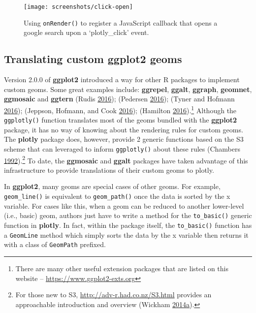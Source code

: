 \documentclass[12pt,]{isuthesis}
\let\rmarkdownfootnote\footnote%
\def\footnote{\protect\rmarkdownfootnote}
\begin{document}
\begin{figure}
\centering
\texttt{[image: screenshots/click-open]}
\caption{\label{fig:click-open}Using \texttt{onRender()} to register a
JavaScript callback that opens a google search upon a `plotly\_click'
event.}
\end{figure}

\hypertarget{translating-custom-ggplot2-geoms}{\subsection{Translating
custom ggplot2 geoms}\label{translating-custom-ggplot2-geoms}}

Version 2.0.0 of \textbf{ggplot2} introduced a way for other R packages
to implement custom geoms. Some great examples include:
\textbf{ggrepel}, \textbf{ggalt}, \textbf{ggraph}, \textbf{geomnet},
\textbf{ggmosaic} and \textbf{ggtern} (Rudis
\protect\hyperlink{ref-ggalt}{2016}); (Pedersen
\protect\hyperlink{ref-ggraph}{2016}); (Tyner and Hofmann
\protect\hyperlink{ref-geomnet}{2016}); (Jeppson, Hofmann, and Cook
\protect\hyperlink{ref-ggmosaic}{2016}); (Hamilton
\protect\hyperlink{ref-ggtern}{2016}).\footnote{There are many other
  useful extension packages that are listed on this website --
  \url{https://www.ggplot2-exts.org}} Although the \texttt{ggplotly()}
function translates most of the geoms bundled with the \textbf{ggplot2}
package, it has no way of knowing about the rendering rules for custom
geoms. The \textbf{plotly} package does, however, provide 2 generic
functions based on the S3 scheme that can leveraged to inform
\texttt{ggplotly()} about these rules (Chambers
\protect\hyperlink{ref-S3}{1992}).\footnote{For those new to S3,
  \url{http://adv-r.had.co.nz/S3.html} provides an approachable
  introduction and overview (Wickham
  \protect\hyperlink{ref-adv-r}{2014}\protect\hyperlink{ref-adv-r}{a}).}
To date, the \textbf{ggmosaic} and \textbf{ggalt} packages have taken
advantage of this infrastructure to provide translations of their custom
geoms to plotly.

In \textbf{ggplot2}, many geoms are special cases of other geoms. For
example, \texttt{geom\_line()} is equivalent to \texttt{geom\_path()}
once the data is sorted by the x variable. For cases like this, when a
geom can be reduced to another lower-level (i.e., basic) geom, authors
just have to write a method for the \texttt{to\_basic()} generic
function in \textbf{plotly}. In fact, within the package itself, the
\texttt{to\_basic()} function has a \texttt{GeomLine} method which
simply sorts the data by the x variable then returns it with a class of
\texttt{GeomPath} prefixed.
\end{document}
